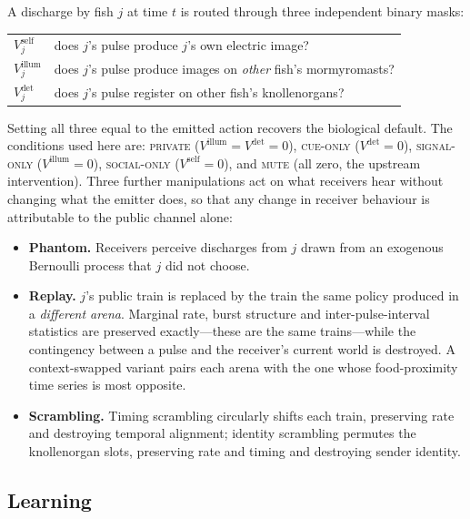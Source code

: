 A discharge by fish $j$ at time $t$ is routed through three independent binary
masks:
\begin{center}
\begin{tabular}{ll}
\toprule
$V^{\text{self}}_j$ & does $j$'s pulse produce $j$'s own electric image? \\
$V^{\text{illum}}_j$ & does $j$'s pulse produce images on \emph{other} fish's mormyromasts? \\
$V^{\text{det}}_j$ & does $j$'s pulse register on other fish's knollenorgans? \\
\bottomrule
\end{tabular}
\end{center}
Setting all three equal to the emitted action recovers the biological default.
The conditions used here are: \textsc{private} ($V^{\text{illum}}=V^{\text{det}}=0$),
\textsc{cue-only} ($V^{\text{det}}=0$), \textsc{signal-only} ($V^{\text{illum}}=0$),
\textsc{social-only} ($V^{\text{self}}=0$), and \textsc{mute} (all zero, the
upstream intervention). Three further manipulations act on what receivers hear
without changing what the emitter does, so that any change in receiver behaviour
is attributable to the public channel alone:
\begin{itemize}[leftmargin=1.4em,itemsep=1pt,topsep=2pt]
\item \textbf{Phantom.} Receivers perceive discharges from $j$ drawn from an
      exogenous Bernoulli process that $j$ did not choose.
\item \textbf{Replay.} $j$'s public train is replaced by the train the same policy
      produced in a \emph{different arena}. Marginal rate, burst structure and
      inter-pulse-interval statistics are preserved exactly---these are the same
      trains---while the contingency between a pulse and the receiver's current
      world is destroyed. A context-swapped variant pairs each arena with the one
      whose food-proximity time series is most opposite.
\item \textbf{Scrambling.} Timing scrambling circularly shifts each train,
      preserving rate and destroying temporal alignment; identity scrambling
      permutes the knollenorgan slots, preserving rate and timing and destroying
      sender identity.
\end{itemize}

\subsection{Learning}

